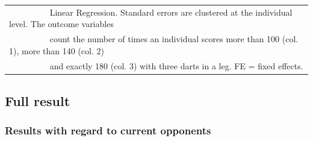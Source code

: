 \documentclass[11pt,a4paper]{article}
\begin{document}
\begin{table}[H]
\begin{tabular}{l r r r r r }
			\multicolumn{6}{l}{\footnotesize ~~~~~~~~~ Linear Regression. Standard errors are clustered at the individual level. The outcome variables }\\
   			\multicolumn{6}{l}{\footnotesize ~~~~~~~~~ count the number of times an individual scores more than 100 (col. 1), more than 140 (col. 2)}\\
   			\multicolumn{6}{l}{\footnotesize ~~~~~~~~~ and exactly 180 (col. 3) with three darts in a leg. FE = fixed effects.}
		\end{tabular}
	\end{table}

\subsection{Full result}\label{subsec:app_full_tabs}

\subsubsection{Results with regard to current opponents}
\end{document}
